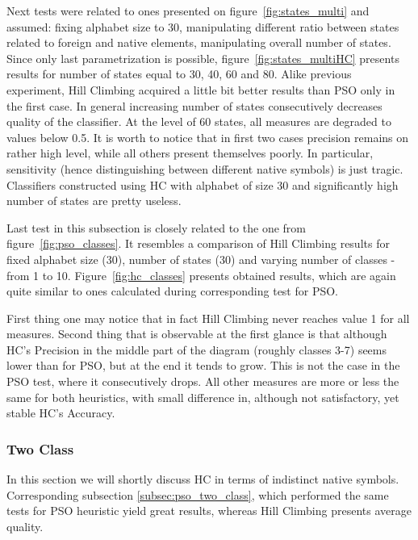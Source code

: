 \documentclass{mini}
\begin{document}
\makeFigureFitnessMultiHC

Next tests were related to ones presented on figure~\ref{fig:states_multi} and assumed: fixing alphabet size to 30, manipulating different ratio between states related to foreign and native elements, manipulating overall number of states. Since only last parametrization is possible, figure~\ref{fig:states_multiHC} presents results for number of states equal to 30, 40, 60 and 80. Alike previous experiment, Hill Climbing acquired a little bit better results than PSO only in the first case. In general increasing number of states consecutively decreases quality of the classifier. At the level of 60 states, all measures are degraded to values below 0.5. It is worth to notice that in first two cases precision remains on rather high level, while all others present themselves poorly. In particular, sensitivity (hence distinguishing between different native symbols) is just tragic. Classifiers constructed using HC with alphabet of size 30 and significantly high number of states are pretty useless.

\makeFigureStateConfigurationMultiHC

Last test in this subsection is closely related to the one from figure~\ref{fig:pso_classes}. It resembles a comparison of  Hill Climbing results for fixed alphabet size (30), number of states (30) and varying number of classes - from 1 to 10. Figure~\ref{fig:hc_classes} presents obtained results, which are again quite similar to ones calculated during corresponding test for PSO.

First thing one may notice that in fact Hill Climbing never reaches value 1 for all measures. Second thing that is observable at the first glance is that although HC's Precision in the middle part of the diagram (roughly classes 3-7) seems lower than for PSO, but at the end it tends to grow. This is not the case in the PSO test, where it consecutively drops. All other measures are more or less the same for both heuristics, with small difference in, although not satisfactory, yet stable HC's Accuracy.

\makeFigureHCClasses


\subsubsection{Two Class} \label{subsec:two_class_hc}
In this section we will shortly discuss HC in terms of indistinct native symbols. Corresponding subsection \ref{subsec:pso_two_class}, which performed the same tests for PSO heuristic yield great results, whereas Hill Climbing presents average quality.
\end{document}
